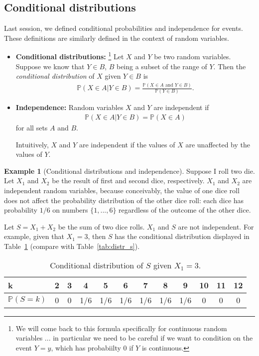\documentclass[11pt]{article}
\theoremstyle{definition}
\newtheorem{example}[theorem]{Example}
\renewcommand{\P}{\mathbb{P}}
\begin{document}
\subsection{Conditional distributions}
Last session, we defined conditional probabilities and independence for events.
These definitions are similarly defined in the context of random variables.
\begin{itemize}
  \item {\bf Conditional distributions: }\footnote{
  We will come back to this formula specifically for continuous random variables ...
  in particular we need to be careful if we want to condition on the event $Y = y$,
  which has probabiilty 0 if $Y$ is continuous.
  }
  Let $X$ and $Y$ be two random variables. Suppose we know that $Y\in B$, $B$
  being a subset of the range of $Y$. Then the
  \textit{conditional distribution} of $X$ given $Y\in B$ is
  \begin{align*}
    \P(X\in A | Y \in B) = \frac{\P(X\in A \text{ and } Y \in B)}{\P(Y \in B)}.
  \end{align*}
  \item {\bf Independence: } Random variables $X$ and $Y$ are independent if
  \begin{align*}
    \P(X\in A | Y \in B) = \P(X\in A)
  \end{align*}
  for all sets $A$ and $B$.

  Intuitively, $X$ and $Y$ are independent if the values of $X$ are unaffected
  by the values of $Y$.
\end{itemize}

\begin{example}[Conditional distributions and independence]
Suppose I roll two die.
Let $X_1$ and $X_2$ be the result of first and second dice, respectively.
$X_1$ and $X_2$ are independent random variables, because conceivably,
the value of one dice roll does not affect the probability distribution of the other dice roll:
each dice has probability $1/6$ on numbers $\{1, ..., 6\}$
regardless of the outcome of the other dice.

Let $S = X_1 + X_2$ be the sum of two dice rolls.
$X_1$ and $S$ are not independent. For example, given that $X_1 = 3$, then
$S$ has the conditional distribution displayed in Table~\ref{tab:cond_s}
(compare with Table~\ref{tab:distr_s}).

\begin{table}[!h]
  \centering
  \begin{tabular}{l|ccccccccccc}
    k& 2 & 3 & 4 & 5 & 6 & 7 & 8 & 9 & 10 & 11 & 12\\\hline
    $\P(S = k)$ & 0 & 0 & 1/6 & 1/6 & 1/6 & 1/6 & 1/6 & 1/6 & 0 & 0 & 0
  \end{tabular}
  \caption{Conditional distribution of $S$ given $X_1 = 3$.}
  \label{tab:cond_s}
\end{table}


\end{example}
\end{document}
